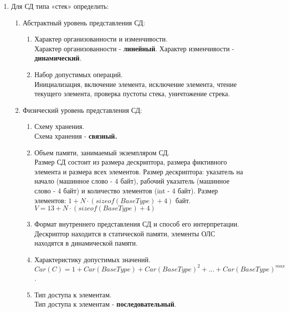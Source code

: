 \documentclass[a4paper,14pt]{extarticle}
\begin{document}
\begin{enumerate}
    \item Для СД типа «стек» определить:
          \begin{enumerate}[label*=\arabic*.]
              \item Абстрактный уровень представления СД:

                    \begin{enumerate}[label*=\arabic*.]
                        \item Характер организованности и изменчивости.\\
                              Характер организованности - \textbf{линейный}. Характер изменчивости - \textbf{динамический}.
                        \item Набор допустимых операций.\\
                              Инициализация,
                              включение элемента,
                              исключение элемента,
                              чтение текущего элемента,
                              проверка пустоты стека,
                              уничтожение стрека.
                    \end{enumerate}

              \item Физический уровень представления СД:

                    \begin{enumerate}[label*=\arabic*.]
                        \item Схему хранения.\\
                              Схема хранения - \textbf{связный.}
                        \item Объем памяти, занимаемый экземпляром СД.\\
                              Размер СД состоит из размера дескриптора, размера фиктивного элемента и размера всех элементов.
                              Размер дескриптора: указатель на начало (машинное слово - 4 байт), рабочий указатель (машинное слово - 4 байт) и количество элементов (int - 4 байт).
                              Размер элементов: $1 + N\cdot(sizeof(BaseType) + 4)$ байт.
                              $V = 13 + N\cdot(sizeof(BaseType) + 4)$
                        \item Формат внутреннего представления СД и способ его интерпретации.\\
                              Дескриптор находится в статической памяти, элементы ОЛС находятся в динамической памяти.
                        \item Характеристику допустимых значений.\\
                              $Car(C) = 1 + Car(BaseType) + Car(BaseType) ^ 2 + ... + Car(BaseType) ^ {max}$.
                        \item Тип доступа к элементам.\\
                              Тип доступа к элементам - \textbf{последовательный}.
                    \end{enumerate}


\end{enumerate}
\end{enumerate}
\end{document}
